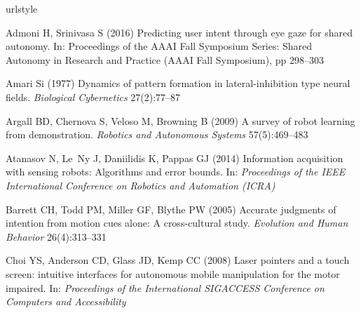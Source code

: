 \documentclass[natbib, twocolumn]{svjour3}          %
\begin{document}
\balance

\begin{thebibliography}{54}
	\providecommand{\natexlab}[1]{#1}
	\providecommand{\url}[1]{{#1}}
	\providecommand{\urlprefix}{URL}
	\expandafter\ifx\csname urlstyle\endcsname\relax
	\providecommand{\doi}[1]{DOI~\discretionary{}{}{}#1}\else
	\providecommand{\doi}{DOI~\discretionary{}{}{}\begingroup
		\urlstyle{rm}\Url}\fi
	\providecommand{\eprint}[2][]{\url{#2}}
	
	Admoni H, Srinivasa S (2016) Predicting user intent through eye gaze for shared
	autonomy. In: Proceedings of the AAAI Fall Symposium Series: Shared Autonomy
	in Research and Practice (AAAI Fall Symposium), pp 298--303
	
	Amari Si (1977) Dynamics of pattern formation in lateral-inhibition type neural
	fields. \textit{Biological Cybernetics} 27(2):77--87
	
	Argall BD, Chernova S, Veloso M, Browning B (2009) A survey of robot learning
	from demonstration. \textit{Robotics and Autonomous Systems} 57(5):469--483
	
	Atanasov N, Le~Ny J, Daniilidis K, Pappas GJ (2014) Information acquisition
	with sensing robots: Algorithms and error bounds. In: \textit{Proceedings of
		the IEEE International Conference on Robotics and Automation (ICRA)}
	
	Barrett CH, Todd PM, Miller GF, Blythe PW (2005) Accurate judgments of
	intention from motion cues alone: A cross-cultural study. \textit{Evolution
		and Human Behavior} 26(4):313--331
	
	Choi YS, Anderson CD, Glass JD, Kemp CC (2008) Laser pointers and a touch
	screen: intuitive interfaces for autonomous mobile manipulation for the motor
	impaired. In: \textit{Proceedings of the International SIGACCESS Conference
		on Computers and Accessibility}
	

\end{thebibliography}
\end{document}
